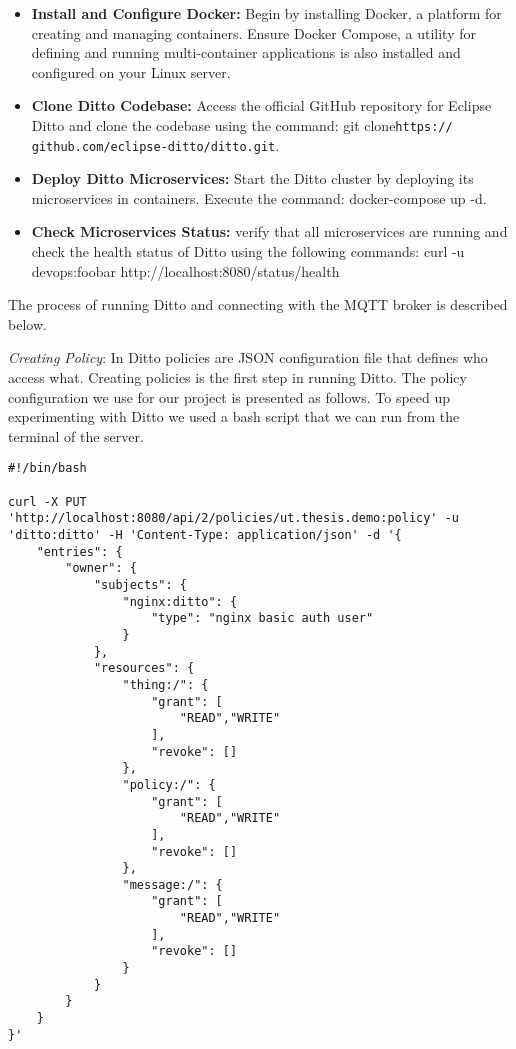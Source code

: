 \begin{itemize}
    \item \textbf{Install and Configure Docker:} Begin by installing Docker, a platform for creating and managing containers. Ensure Docker Compose, a utility for defining and running multi-container applications is also installed and configured on your Linux server.
    \item \textbf{Clone Ditto Codebase:} Access the official GitHub repository for Eclipse Ditto and clone the codebase using the command: git clone\texttt{https:// github.com/eclipse-ditto/ditto.git}. 
    \item \textbf{Deploy Ditto Microservices:} Start the Ditto cluster by deploying its microservices in containers. Execute the command: docker-compose up -d. 
    \item \textbf{Check Microservices Status:} verify that all microservices are running and check the health status of Ditto using the following commands: curl -u devops:foobar http://localhost:8080/status/health
\end{itemize}



The process of running Ditto and connecting with the MQTT broker is described below.

\textit{Creating Policy}: In Ditto policies are JSON configuration file that defines who access what. Creating policies is the first step in running Ditto. The policy configuration we use for our project is presented as follows. To speed up experimenting with Ditto we used a bash script that we can run from the terminal of the server. 
\begin{lstlisting}[style=CStyle, caption={A Bash Script of Ditto command To Create Connection}]
#!/bin/bash

curl -X PUT 'http://localhost:8080/api/2/policies/ut.thesis.demo:policy' -u 'ditto:ditto' -H 'Content-Type: application/json' -d '{
    "entries": {
        "owner": {
            "subjects": {
                "nginx:ditto": {
                    "type": "nginx basic auth user"
                }
            },
            "resources": {
                "thing:/": {
                    "grant": [
                        "READ","WRITE"
                    ],
                    "revoke": []
                },
                "policy:/": {
                    "grant": [
                        "READ","WRITE"
                    ],
                    "revoke": []
                },
                "message:/": {
                    "grant": [
                        "READ","WRITE"
                    ],
                    "revoke": []
                }
            }
        }
    }
}'
\end{lstlisting}


